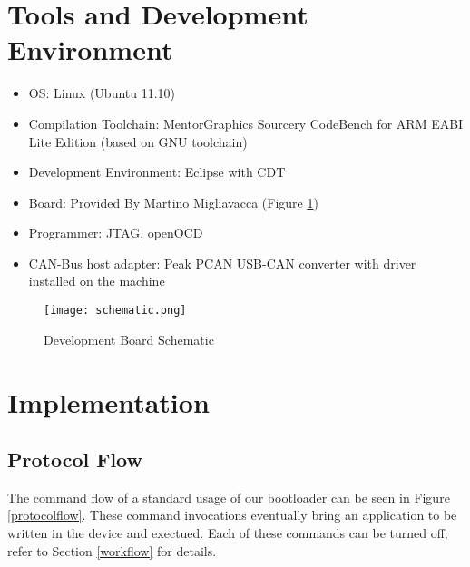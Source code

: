 \documentclass[11pt]{article} %
\begin{document}

\section{Tools and Development Environment}
\begin{itemize}
\item OS: Linux (Ubuntu 11.10)
\item Compilation Toolchain: MentorGraphics Sourcery CodeBench for ARM EABI Lite Edition (based on GNU toolchain)
\item Development Environment: Eclipse with CDT
\item Board: Provided By Martino Migliavacca (Figure \ref{schematic})
\item Programmer: JTAG, openOCD
\item CAN-Bus host adapter: Peak PCAN USB-CAN converter with driver installed on the machine
\end{itemize}

\begin{figure}[h]
\begin{center}
\texttt{[image: schematic.png]}
\end{center}
\caption{Development Board Schematic}
\label{schematic}
\end{figure}


\section{Implementation}

\subsection{Protocol Flow}
The command flow of a standard usage of our bootloader can be seen in Figure \ref{protocolflow}. These command invocations eventually bring an application to be written in the device and exectued. Each of these commands can be turned off; refer to Section \ref{workflow} for details.
\end{document}
